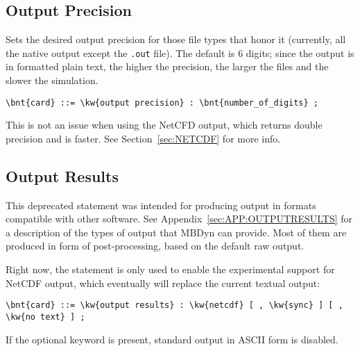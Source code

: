 \subsection{Output Precision}
Sets the desired output precision for those file types that honor it
(currently, all the native output except the \texttt{.out} file).
The default is 6 digits; since the output is in formatted plain text,
the higher the precision, the larger the files and the slower the simulation.
\begin{Verbatim}[commandchars=\\\{\}]
    \bnt{card} ::= \kw{output precision} : \bnt{number_of_digits} ;
\end{Verbatim}
This is not an issue when using the NetCFD output, which returns double
precision and is faster. See Section~\ref{sec:NETCDF} for more info.

\subsection{Output Results}\label{sec:CONTROLDATA:NETCDF}
This deprecated statement was intended for producing output in formats
compatible with other software.
See Appendix~\ref{sec:APP:OUTPUTRESULTS} for a description of the types
of output that MBDyn can provide.
Most of them are produced in form of post-processing, based on the default
raw output.

Right now, the  statement is only used to enable
the experimental support for NetCDF output, which eventually
will replace the current textual output:
\begin{Verbatim}[commandchars=\\\{\}]
    \bnt{card} ::= \kw{output results} : \kw{netcdf} [ , \kw{sync} ] [ , \kw{no text} ] ;
\end{Verbatim}
If the optional keyword  is present,
standard output in ASCII form is disabled.

